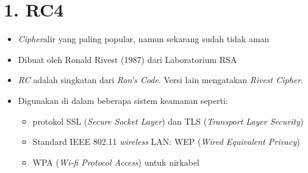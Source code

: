 \documentclass{article}
\begin{document}

\section*{1. RC4}

\begin{itemize}
    \item \textit{Cipher}alir yang paling popular, namun sekarang sudah tidak aman
    \item Dibuat oleh Ronald Rivest (1987) dari Laboratorium RSA
    \item \textit{RC} adalah singkatan dari \textit{Ron's Code}. Versi lain mengatakan \textit{Rivest Cipher}.
    \item Digunakan di dalam beberapa sistem keamanan seperti:
    \begin{itemize}
        \item protokol SSL (\textit{Secure Socket Layer}) dan TLS (\textit{Transport Layer Security})
        \item Standard IEEE 802.11 \textit{wireless} LAN: WEP (\textit{Wired Equivalent Privacy})
        \item WPA (\textit{Wi-fi Protocol Access}) untuk nirkabel
    \end{itemize}
\end{itemize}
\end{document}
